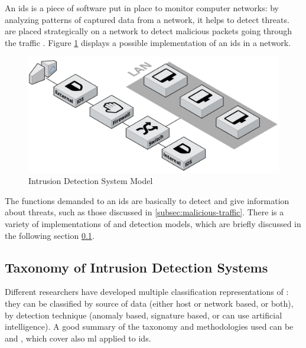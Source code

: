 An \gls{ids} is a piece of software put in place to monitor computer networks: by analyzing patterns of captured data from a network, it helps to detect threats.  are placed strategically on a network to detect malicious packets going through the traffic \cite{Hodo2017}. Figure \ref{fig:IDS-model} displays a possible implementation of an \gls{ids} in a network.

\begin{figure}[h!]
        \centering
        \includegraphics[scale=0.24]{assets/figures/chapter2/Intrusion Detection System Model.png}
        \caption{Intrusion Detection System Model}
        \label{fig:IDS-model}
\end{figure}
\noindent The functions demanded to an \gls{ids} are basically to detect and give information about threats, such as those discussed in \ref{subsec:malicious-traffic}. There is a variety of implementations of  and detection models, which are briefly discussed in the following section \ref{subsec:taxonomy-ids}.



\subsection{Taxonomy of Intrusion Detection Systems}
\label{subsec:taxonomy-ids}

Different researchers have developed multiple classification representations of : they can be classified by source of data (either host or network based, or both), by detection technique (anomaly based, signature based, or can use artificial intelligence). A good summary of the taxonomy and methodologies used can be \cite{Hodo2017} and \cite{Liu2019}, which cover also \gls{ml} applied to \gls{ids}.

